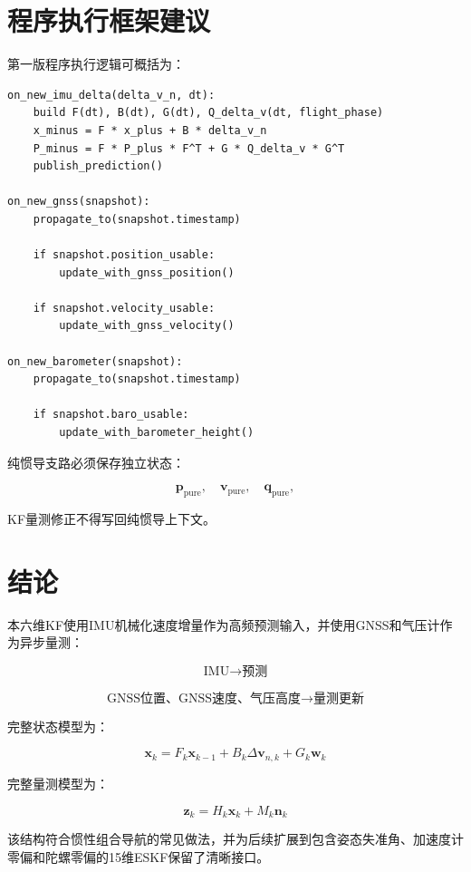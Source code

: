 \documentclass[12pt,a4paper]{ctexart}
\begin{document}
\section{程序执行框架建议}

第一版程序执行逻辑可概括为：

\begin{verbatim}
on_new_imu_delta(delta_v_n, dt):
    build F(dt), B(dt), G(dt), Q_delta_v(dt, flight_phase)
    x_minus = F * x_plus + B * delta_v_n
    P_minus = F * P_plus * F^T + G * Q_delta_v * G^T
    publish_prediction()

on_new_gnss(snapshot):
    propagate_to(snapshot.timestamp)

    if snapshot.position_usable:
        update_with_gnss_position()

    if snapshot.velocity_usable:
        update_with_gnss_velocity()

on_new_barometer(snapshot):
    propagate_to(snapshot.timestamp)

    if snapshot.baro_usable:
        update_with_barometer_height()
\end{verbatim}

纯惯导支路必须保存独立状态：

\[
\mathbf p_{\mathrm{pure}},
\quad
\mathbf v_{\mathrm{pure}},
\quad
\mathbf q_{\mathrm{pure}},
\]

KF量测修正不得写回纯惯导上下文。

\section{结论}

本六维KF使用IMU机械化速度增量作为高频预测输入，并使用GNSS和气压计作为异步量测：

\[
\boxed{
\text{IMU} \rightarrow \text{预测}
}
\]

\[
\boxed{
\text{GNSS位置、GNSS速度、气压高度}
\rightarrow
\text{量测更新}
}
\]

完整状态模型为：

\[
\boxed{
\mathbf x_k =
F_k\mathbf x_{k-1}
+
B_k\Delta\mathbf v_{n,k}
+
G_k\mathbf w_k
}
\]

完整量测模型为：

\[
\boxed{
\mathbf z_k =
H_k\mathbf x_k
+
M_k\mathbf n_k
}
\]

该结构符合惯性组合导航的常见做法，并为后续扩展到包含姿态失准角、加速度计零偏和陀螺零偏的15维ESKF保留了清晰接口。
\end{document}
